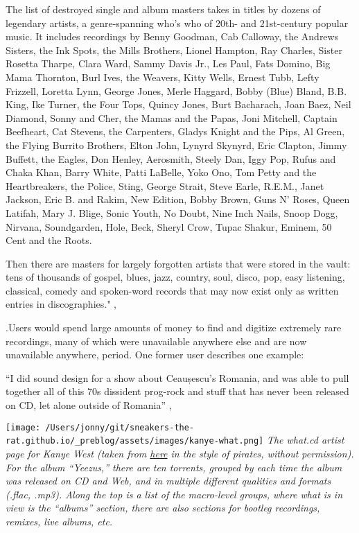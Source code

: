 \documentclass[nohyper]{tufte-book-jls}
\begin{document}
{\begin{leftbar}
  The list of destroyed single and album masters takes in titles by
  dozens of legendary artists, a genre-spanning who's who of 20th- and
  21st-century popular music. It includes recordings by Benny Goodman,
  Cab Calloway, the Andrews Sisters, the Ink Spots, the Mills Brothers,
  Lionel Hampton, Ray Charles, Sister Rosetta Tharpe, Clara Ward, Sammy
  Davis Jr., Les Paul, Fats Domino, Big Mama Thornton, Burl Ives, the
  Weavers, Kitty Wells, Ernest Tubb, Lefty Frizzell, Loretta Lynn,
  George Jones, Merle Haggard, Bobby (Blue) Bland, B.B. King, Ike
  Turner, the Four Tops, Quincy Jones, Burt Bacharach, Joan Baez, Neil
  Diamond, Sonny and Cher, the Mamas and the Papas, Joni Mitchell,
  Captain Beefheart, Cat Stevens, the Carpenters, Gladys Knight and the
  Pips, Al Green, the Flying Burrito Brothers, Elton John, Lynyrd
  Skynyrd, Eric Clapton, Jimmy Buffett, the Eagles, Don Henley,
  Aerosmith, Steely Dan, Iggy Pop, Rufus and Chaka Khan, Barry White,
  Patti LaBelle, Yoko Ono, Tom Petty and the Heartbreakers, the Police,
  Sting, George Strait, Steve Earle, R.E.M., Janet Jackson, Eric B. and
  Rakim, New Edition, Bobby Brown, Guns N' Roses, Queen Latifah, Mary J.
  Blige, Sonic Youth, No Doubt, Nine Inch Nails, Snoop Dogg, Nirvana,
  Soundgarden, Hole, Beck, Sheryl Crow, Tupac Shakur, Eminem, 50 Cent
  and the Roots.

  Then there are masters for largely forgotten artists that were stored
  in the vault: tens of thousands of gospel, blues, jazz, country, soul,
  disco, pop, easy listening, classical, comedy and spoken-word records
  that may now exist only as written entries in discographies." \cite{rosenDayMusicBurned2019},\end{leftbar}}.Users would spend large amounts of money to find and
digitize extremely rare recordings, many of which were unavailable
anywhere else and are now unavailable anywhere, period. One former user
describes one example:

\begin{leftbar}
``I did sound design for a show about Ceaușescu's Romania, and was able
to pull together all of this 70s dissident prog-rock and stuff that has
never been released on CD, let alone outside of Romania'' \cite{sonnadEulogyWhatCd2016},\end{leftbar}
\texttt{[image: /Users/jonny/git/sneakers-the-rat.github.io/\_preblog/assets/images/kanye-what.png]} \emph{The what.cd
artist page for Kanye West (taken from
\href{https://qz.com/840661/what-cd-is-gone-a-eulogy-for-the-greatest-music-collection-in-the-world/}{here}
in the style of pirates, without permission). For the album ``Yeezus,''
there are ten torrents, grouped by each time the album was released on
CD and Web, and in multiple different qualities and formats (.flac,
.mp3). Along the top is a list of the macro-level groups, where what is
in view is the ``albums'' section, there are also sections for bootleg
recordings, remixes, live albums, etc.}
\end{document}
